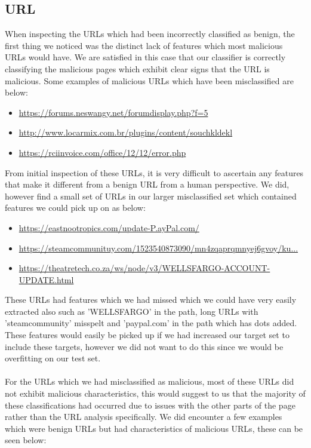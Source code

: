 \documentclass[12pt,twoside]{report}
\begin{document}
\subsection{URL}
When inspecting the URLs which had been incorrectly classified as benign, the first thing we noticed was the distinct lack of features which most malicious URLs would have. We are satisfied in this case that our classifier is correctly classifying the malicious pages which exhibit clear signs that the URL is malicious. Some examples of malicious URLs which have been misclassified are below:
\begin{itemize}
    \item \url{https://forums.neswangy.net/forumdisplay.php?f=5}
    \item \url{http://www.locarmix.com.br/plugins/content/souchkldekl}
    \item \url{https://rciinvoice.com/office/12/12/error.php}
\end{itemize}
From initial inspection of these URLs, it is very difficult to ascertain any features that make it different from a benign URL from a human perspective. We did, however find a small set of URLs in our larger misclassified set which contained features we could pick up on as below:
\begin{itemize}
    \item \url{https://eastnootropics.com/update-P.ayPal.com/}
    \item \url{https://steamcommunituy.com/1523540873090/mn4zqaprqmnyej6gvoy/ku...}
    \item \url{https://theatretech.co.za/ws/node/v3/WELLSFARGO-ACCOUNT-UPDATE.html}
\end{itemize}
These URLs had features which we had missed which we could have very easily extracted also such as 'WELLSFARGO' in the path, long URLs with 'steamcommunity' misspelt and 'paypal.com' in the path which has dots added. These features would easily be picked up if we had increased our target set to include these targets, however we did not want to do this since we would be overfitting on our test set.
\\\\
For the URLs which we had misclassified as malicious, most of these URLs did not exhibit malicious characteristics, this would suggest to us that the majority of these classifications had occurred due to issues with the other parts of the page rather than the URL analysis specifically. We did encounter a few examples which were benign URLs but had characteristics of malicious URLs, these can be seen below:
\end{document}
